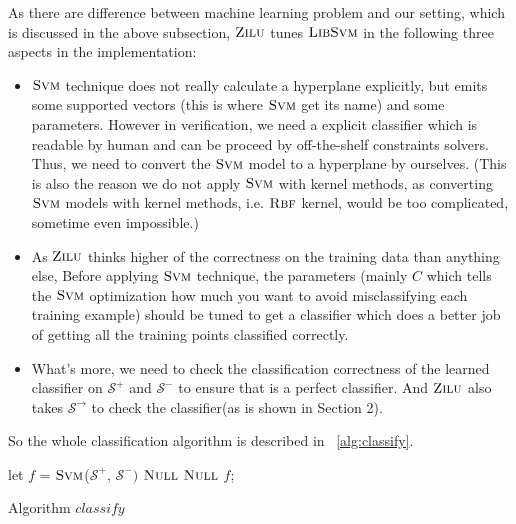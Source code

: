 As there are difference between machine learning problem and our setting, which is discussed in the above subsection,
$\textsc{Zilu}$ tunes $\textsc{LibSvm}$ in the following three aspects in the implementation: 
\begin{itemize}
\item $\textsc{Svm}$ technique does not really calculate a hyperplane explicitly, 
but emits some supported vectors (this is where $\textsc{Svm}$ get its name) and some parameters.
However in verification, we need a explicit classifier which is readable by human and can be proceed by off-the-shelf constraints solvers.
Thus, we need to convert the $\textsc{Svm}$ model to a hyperplane by ourselves.
(This is also the reason we do not apply $\textsc{Svm}$ with kernel methods,
as converting $\textsc{Svm}$ models with kernel methods, i.e. $\textsc{Rbf}$ kernel, would be too complicated, sometime even impossible.)
\item As $\textsc{Zilu}$ thinks higher of the correctness on the training data than anything else,
Before applying $\textsc{Svm}$ technique, the parameters (mainly $C$ which tells the $\textsc{Svm}$ optimization how much you want to avoid misclassifying each training example)
should be tuned to get a classifier which does a better job of getting all the training points classified correctly.
\item What's more, we need to check the classification correctness of the learned classifier 
on $\mathcal{S}^+$ and $\mathcal{S}^-$ to ensure that is a perfect classifier.
And $\textsc{Zilu}$ also takes $\mathcal{S}^\rightarrow$ to check the classifier(as is shown in Section 2).
\end{itemize} 

So the whole classification algorithm is described in ~\ref{alg:classify}.

\begin{algorithm}[!h]
\SetAlgoVlined
\Indm
{}
\Indp
    let $f$ = $\textsc{Svm}$($\mathcal{S}^+$, $\mathcal{S}^-)$\;
     {
        \Return $\textsc{Null}$\;
    }
     {
        \Return $\textsc{Null}$\;
    }
    \Return $f$;
\caption{Algorithm $classify$}
\label{alg:classify}
\end{algorithm}

